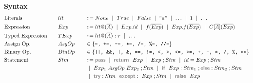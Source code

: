 \documentclass[11pt]{jarticle}
\newcommand{\gray}[1]{\textbf{\textsf{\color{Gray}#1}}}
\begin{document}
{\bf Syntax}
\begin{alignat*}{3} %
  &\text{Literals} &&lit &&\Coloneqq None ~\mid~ True ~\mid~ False ~\mid~ "a" ~\mid~ \dots ~\mid~ 1 ~\mid~ \dots\\
  &\text{Expression}~~~ &&Exp &&\Coloneqq lit\gray{@}(\overline{A}) ~\mid~ Exp.id  ~\mid~ f(\overline{Exp}) ~\mid~ Exp.f(\overline{Exp}) ~\mid~ C[\overline{A}](\overline{Exp})\\
  &\text{Typed Expression}~~~ &&TExp &&\Coloneqq lit\gray{@}(\overline{A}):\tau ~\mid~ \dots\\
  &\text{Assign Op.} &&AsgOp~~~ &&\in \{\texttt{=, +=, -=, *=, /=, \%=, //=}\}\\
  &\text{Binary Op.} &&BinOp &&\in \{\texttt{||, \&\&, |, \&, ==, !=, <, >, <=, >=, +, -, *, /, \%, **}\}\\
  &\text{Statement} &&Stm &&\Coloneqq \gray{pass} ~\mid~ \gray{return}~~ Exp ~\mid~ Exp ~; Stm ~\mid~ id = Exp ~; Stm \\
  &&&&& ~\mid~ Exp_1~AsgOp~Exp_2 ~; Stm ~\mid~ \gray{if}~~Exp:Stm_1~;\gray{else}:Stm_2 ~;Stm\\
  &&&&& ~\mid~ \gray{try}:Stm ~~ \gray{except}:~Exp~;Stm ~\mid~ \gray{raise} ~~Exp
\end{alignat*}
\end{document}
